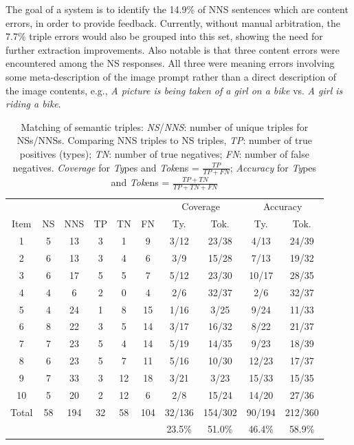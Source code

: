 The goal of a system is to identify the 14.9\% of NNS sentences
which are content errors, in order to provide feedback.  Currently, without manual arbitration,
the 7.7\% triple errors would also be grouped into this set, showing
the need for further extraction improvements.  Also notable is that
three content errors were encountered among the NS responses. All
three were meaning errors involving some meta-description of the image
prompt rather than a direct description of the image contents, e.g.,
\textit{A picture is being taken of a girl on a bike} vs. \textit{A
  girl is riding a bike}.

\begin{table}[htb!]
\begin{center}
\begin{tabular}{|c||c|c||c|c|c||cc|cc|}
\hline
  & & & & & & \multicolumn{2}{c|}{Coverage} & \multicolumn{2}{c|}{Accuracy}\\
 Item & NS & NNS & TP & TN & FN & Ty. & Tok. & Ty. & Tok.\\
\hline
\hline
1 & 5 & 13 & 3 & 1 & 9 & 3/12 & 23/38 & 4/13 & 24/39 \\%
\hline
2 & 6 & 13 & 3 & 4 & 6 & 3/9 & 15/28 & 7/13 & 19/32 \\%
\hline
3 & 6 & 17 & 5 & 5 & 7 & 5/12 & 23/30 & 10/17 & 28/35 \\%
\hline
4 & 4 & 6 & 2 & 0 & 4 & 2/6 & 32/37 & 2/6 & 32/37 \\%
\hline
5 & 4 & 24 & 1 & 8 & 15 & 1/16 & 3/25 & 9/24 & 11/33 \\%
\hline
6 & 8 & 22 & 3 & 5 & 14 & 3/17 & 16/32 & 8/22 & 21/37 \\%
\hline
7 & 7 & 23 & 5 & 4 & 14 & 5/19 & 14/35 & 9/23 & 18/39 \\%
\hline
8 & 6 & 23 & 5 & 7 & 11 & 5/16 & 10/30 & 12/23 & 17/37 \\%
\hline
9 & 7 & 33 & 3 & 12 & 18 & 3/21 & 3/23 & 15/33 & 15/35 \\%
\hline
10 & 5 & 20 & 2 & 12 & 6 & 2/8 & 15/24 & 14/20 & 27/36 \\%
\hline
\hline
Total & 58 & 194 & 32 & 58 & 104 & 32/136 & 154/302 & 90/194 & 212/360\\%
      &    &     &    &    &     & 23.5\% & 51.0\% & 46.4\% & 58.9\%\\%
\hline
\end{tabular}
\end{center}
\caption{Matching of semantic triples: \emph{NS}/\emph{NNS}: number of
  unique triples for NSs/NNSs. Comparing NNS triples to NS triples,
  \emph{TP}: number of true positives (types); \emph{TN}: number of
  true negatives; \emph{FN}: number of false negatives.
  \emph{Coverage} for \emph{Ty}pes and \emph{Tok}ens =
  $\frac{TP}{TP+FN}$; \emph{Accuracy} for \emph{Ty}pes and
  \emph{Tok}ens = $\frac{TP+TN}{TP+TN+FN}$}

\label{tab:triple-coverage}
\end{table}

